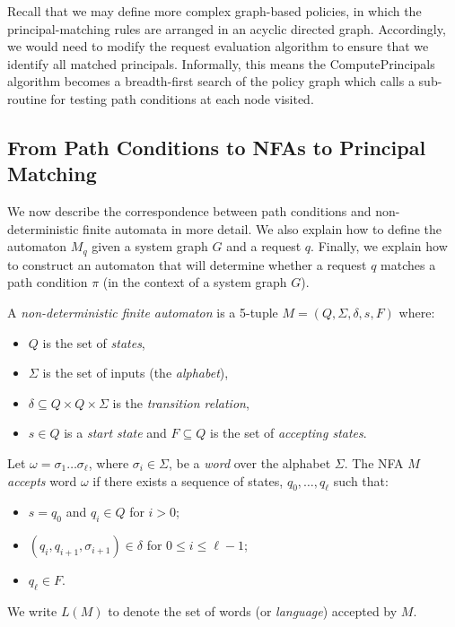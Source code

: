 \documentclass{article}
\begin{document}
Recall that we may define more complex graph-based policies, in which the principal-matching rules are arranged in an acyclic directed graph.
Accordingly, we would need to modify the request evaluation algorithm to ensure that we identify all matched principals.
Informally, this means the \textsf{ComputePrincipals} algorithm becomes a breadth-first search of the policy graph which calls a sub-routine for testing path conditions at each node visited.

\subsection{From Path Conditions to NFAs to Principal Matching}\label{sec:requests:path-conditions-to-principal-matching}

We now describe the correspondence between path conditions and non-deterministic finite automata in more detail.
We also explain how to define the automaton $M_q$ given a system graph $G$ and a request $q$.
Finally, we explain how to construct an automaton that will determine whether a request $q$ matches a path condition $\pi$ (in the context of a system graph $G$).

A \emph{non-deterministic finite automaton} is a 5-tuple $M = (Q, \Sigma, \delta, s, F)$ where:
\begin{itemize}
 \item $Q$ is the set of \emph{states},
 \item $\Sigma$ is the set of inputs (the \emph{alphabet}),
 \item $\delta \subseteq Q \times Q \times \Sigma$ is the \emph{transition relation},
 \item $s \in Q$ is a \emph{start state} and $F \subseteq Q$ is the set of \emph{accepting states}.
\end{itemize}
Let $\omega = \sigma_1 \dots \sigma_\ell$, where $\sigma_i \in \Sigma$, be a \emph{word} over the alphabet $\Sigma$.
The NFA $M$ \emph{accepts} word $\omega$ if there exists a sequence of states, $q_0,\dots,q_\ell$ such that:
\begin{itemize}
 \item $s = q_0$ and $q_i \in Q$ for $i > 0$;
 \item $(q_i, q_{i+1},\sigma_{i+1}) \in \delta$ for $0 \leq i \leq \ell-1$;
 \item $q_\ell \in F$.
\end{itemize}
We write $L(M)$ to denote the set of words (or \emph{language}) accepted by $M$.
\end{document}

